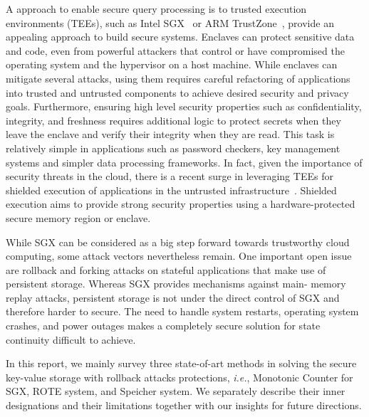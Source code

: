 A approach to enable secure query processing is to trusted execution environments (TEEs), such as Intel SGX~\cite{} or ARM TrustZone~\cite{}, provide an appealing approach to build secure systems. Enclaves can protect sensitive data and code, even from powerful attackers that control or have compromised the operating system and the hypervisor on a host machine. While enclaves can mitigate several attacks, using them requires careful refactoring of applications into trusted and untrusted components to achieve desired security and privacy goals. Furthermore, ensuring high level security properties such as confidentiality, integrity, and freshness requires additional logic to protect secrets when they leave the enclave and verify their integrity when they are read. This task is relatively simple in applications such as password checkers, key management systems and simpler data processing frameworks. In fact, given the importance of security threats in the cloud, there is a recent surge in leveraging TEEs for shielded execution of applications in the untrusted infrastructure~\cite{}. Shielded execution aims to provide strong security properties using a hardware-protected secure memory region or enclave.

While SGX can be considered as a big step forward towards trustworthy cloud computing, some attack vectors nevertheless remain. One important open issue are rollback and forking attacks on stateful applications that make use of persistent storage. Whereas SGX provides mechanisms against main- memory replay attacks, persistent storage is not under the direct control of SGX and therefore harder to secure. The need to handle system restarts, operating system crashes, and power outages makes a completely secure solution for state continuity difficult to achieve. 

In this report, we mainly survey three state-of-art methods in solving the secure key-value storage with rollback attacks protections, \textit{i.e.}, Monotonic Counter for SGX, ROTE system, and Speicher system. We separately describe their inner designations and their limitations together with our insights for future directions.
